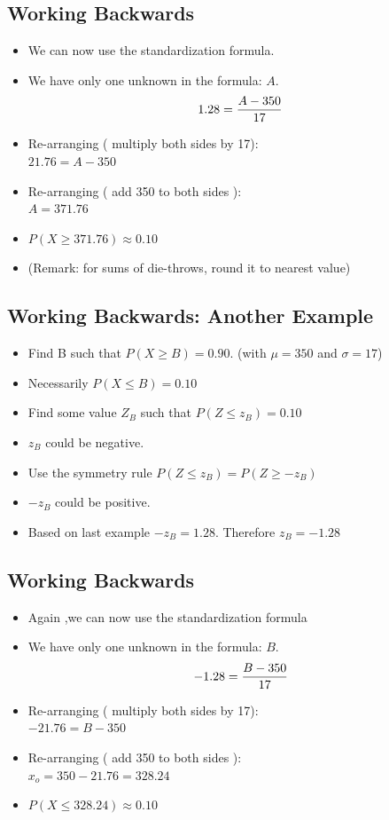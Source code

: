 ﻿\documentclass[]{report}
\begin{document}
{
\subsection{Working Backwards}
\begin{itemize}
\item We can now use the standardization formula.
\item We have only one unknown in the formula: $A$.
\[ 1.28 = {A - 350 \over 17} \]
\item Re-arranging ( multiply both sides by 17):\\
$ 21.76 = A - 350 $
\item Re-arranging ( add 350 to both sides ):\\
$ A = 371.76 $
\item $P(X \geq 371.76) \approx 0.10$
\item (Remark: for sums of die-throws, round it to nearest value)
\end{itemize}

\subsection{Working Backwards: Another Example}
\begin{itemize}

\item Find B such that $P(X \geq B) = 0.90$. (with $\mu  = 350$ and $\sigma = 17$)
\item Necessarily $P(X \leq B) = 0.10$
\item Find some value $Z_B$ such that $P(Z \leq z_B) = 0.10$
\item $z_B$ could be negative.
\item Use the symmetry rule $P(Z \leq z_B) = P(Z \geq -z_B)$
\item $-z_B$ could be positive.
\item Based on last example $-z_B = 1.28$. Therefore $z_B = -1.28$
\end{itemize}

\subsection{Working Backwards}
\begin{itemize}
\item Again ,we can now use the standardization formula
\item We have only one unknown in the formula: $B$.
\[ -1.28 = {B - 350 \over 17} \]
\item Re-arranging ( multiply both sides by 17):\\
$ -21.76 = B - 350 $
\item Re-arranging ( add 350 to both sides ):\\
$ x_o = 350 - 21.76 = 328.24 $
\item $P(X \leq 328.24) \approx 0.10$
\end{itemize}
}




%
\end{document}

